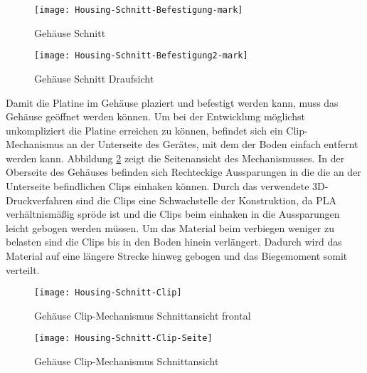 \begin{figure}[h]
	\begin{minipage}{.35\linewidth}
		\centering
		\texttt{[image: Housing-Schnitt-Befestigung-mark]}
		\caption{Gehäuse Schnitt}
		\label{fig:Housing-Befestigung}
	\end{minipage}
	\hfill
	\begin{minipage}{.55\linewidth}
		\centering
		\texttt{[image: Housing-Schnitt-Befestigung2-mark]}
		\caption{Gehäuse Schnitt Draufsicht}
		\label{fig:Housing-Befestigung2}
	\end{minipage}
\end{figure}
Damit die Platine im Gehäuse plaziert und befestigt werden kann, muss das Gehäuse geöffnet werden können. Um bei der Entwicklung möglichst unkompliziert die Platine erreichen zu können, befindet sich ein Clip-Mechanismus an der Unterseite des Gerätes, mit dem der Boden einfach entfernt werden kann. Abbildung \ref{fig:Housing-clip-side} zeigt die Seitenansicht des Mechanismusses. In der Oberseite des Gehäuses befinden sich Rechteckige Aussparungen in die die an der Unterseite befindlichen Clips einhaken können. Durch das verwendete 3D-Druckverfahren sind die Clips eine Schwachstelle der Konstruktion, da PLA verhältnismäßig spröde ist und die Clips beim einhaken in die Aussparungen leicht gebogen werden müssen. Um das Material beim verbiegen weniger zu belasten sind die Clips bis in den Boden hinein verlängert. Dadurch wird das Material auf eine längere Strecke hinweg gebogen und das Biegemoment somit verteilt.
\begin{figure}[h]
		\begin{minipage}{.45\linewidth}
		\centering
		\texttt{[image: Housing-Schnitt-Clip]}
		\caption{Gehäuse Clip-Mechanismus Schnittansicht frontal}
		\label{fig:Housing-clip}
	\end{minipage}
	\hfill
	\begin{minipage}{.45\linewidth}
		\centering
		\texttt{[image: Housing-Schnitt-Clip-Seite]}
		\caption{Gehäuse Clip-Mechanismus Schnittansicht}
		\label{fig:Housing-clip-side}
	\end{minipage}
\end{figure}\\
